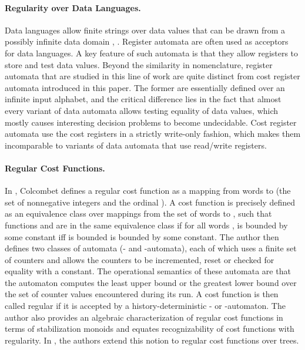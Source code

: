 \documentclass[11pt]{article}
\begin{document}
\paragraph{Regularity over Data Languages.} Data languages allow
finite strings over data values that can be drawn from a possibly
infinite data domain \cite{neven_finite_2004},
\cite{kaminski_finite_1994} \cite{bjorklund_notions_2010}. Register
automata are often used as acceptors for data languages. A key feature
of such automata is that they allow registers to store and test data
values.  Beyond the similarity in nomenclature, register automata that
are studied in this line of work are quite distinct from cost register
automata introduced in this paper. The former are essentially defined
over an infinite input alphabet, and the critical difference lies in
the fact that almost every variant of data automata allows testing
equality of data values, which mostly causes interesting decision
problems to become undecidable. Cost register automata use the cost
registers in a strictly write-only fashion, which makes them
incomparable to variants of data automata that use read/write
registers.



\paragraph{Regular Cost Functions.}
In \cite{colcombet_theory_2009}, Colcombet defines a regular cost
function as a mapping from words to  (the set of
nonnegative integers and the ordinal ). A cost function is
precisely defined as an equivalence class over mappings from the set
of words to , such that functions  and  are
in the same equivalence class if for all words ,  is bounded
by some constant iff  is bounded is bounded by some constant.
The author then defines two classes of automata (- and
-automata), each of which uses a finite set of counters and allows
the counters to be incremented, reset or checked for equality with a
constant. The operational semantics of these automata are that the
automaton computes the least upper bound or the greatest lower bound
over the set of counter values encountered during its run. A cost
function is then called regular if it is accepted by a
history-deterministic - or -automaton.  The author also provides
an algebraic characterization of regular cost functions in terms of
stabilization monoids and equates recognizability of cost functions
with regularity. In \cite{colcombet_regular_2010}, the authors extend
this notion to regular cost functions over trees.
\end{document}
